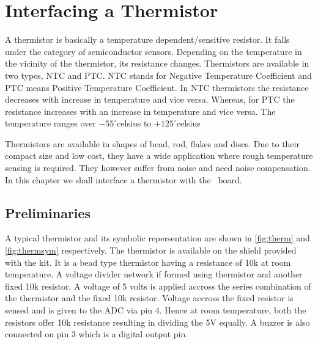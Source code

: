 \chapter {Interfacing a Thermistor}
\thispagestyle{empty}
\label{thermistor}

\newcommand{\LocTHERMfig}{\Origin/user-code/thermistor/figures}
\newcommand{\LocTHERMscicode}{\Origin/user-code/thermistor/scilab}
\newcommand{\LocTHERMscibrief}{Origin/user-code/thermistor/scilab}
\newcommand{\LocTHERMardcode}{\Origin/user-code/thermistor/arduino}
\newcommand{\LocTHERMardbrief}{Origin/user-code/thermistor/arduino}

A thermistor is basically a temperature dependent/sensitive resistor. It falls under the category of semiconductor sensors. Depending on the temperature in the vicinity of the thermistor, its resistance changes. Thermistors are available in two types, NTC and PTC. NTC stands for Negative Temperature Coefficient and PTC means Positive Temperature Coefficient. In NTC thermistors the resistance decreases with increase in temperature and vice versa. Whereas, for PTC the resistance increases with an increase in temperature and vice versa. The temperature ranges over $-55^{\circ}$celsius to $+125^{\circ}$celsius

Thermistors are available in shapes of bead, rod, flakes and discs. Due to their compact size and low cost, they have a wide application where rough temperature sensing is required. They however suffer from noise and need noise compensation. In this chapter we shall interface a thermistor with the \arduino\ board.  

\section{Preliminaries}
A typical thermistor and its symbolic repersentation are shown in \ref{fig:therm} and \ref{fig:thermsym} respectively. The thermistor is available on the shield provided with the kit. It is a bead type thermistor having a resistance of 10k at room temperature. A voltage divider network if formed using thermistor and another fixed 10k resistor. A voltage of 5 volts is applied accross the series combination of the thermistor and the fixed 10k resistor. Voltage accross the fixed resistor is sensed and is given to the ADC via pin 4. Hence at room temperature, both the resistors offer 10k resistance resulting in dividing the 5V equally. A buzzer is also connected on pin 3 which is a digital output pin. 

